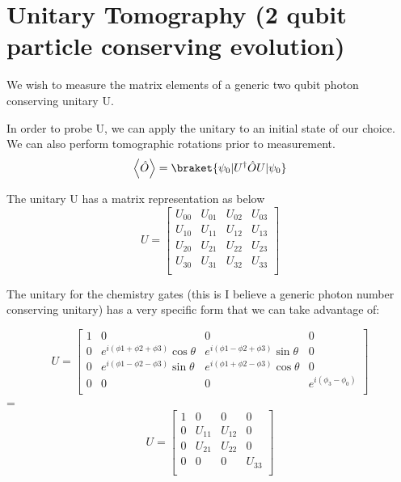 
\section{Unitary Tomography (2 qubit particle conserving evolution)}
We wish to measure the matrix elements of a generic two qubit photon conserving unitary U.

In order to probe U, we can apply the unitary to an initial state of our choice.  We can also perform tomographic rotations prior to measurement.
\begin{equation}
    \left< \hat{O} \right> = \braket{\psi_0 | U^{\dagger} \hat{O} U | \psi_0 }
\end{equation}

The unitary U has a matrix representation as below
\begin{equation}
    U =
    \begin{bmatrix}
        U_{00} & U_{01} & U_{02} & U_{03} \\
        U_{10} & U_{11} & U_{12} & U_{13} \\
        U_{20} & U_{21} & U_{22} & U_{23} \\
        U_{30} & U_{31} & U_{32} & U_{33} \\
    \end{bmatrix}
\end{equation}

The unitary for the chemistry gates (this is I believe a generic photon number conserving unitary) has a very specific form that we can take advantage of:

\begin{equation}
    U=
    \begin{bmatrix}
        1 & 0 & 0 & 0 \\
        0 & e^{ i (\phi{1} + \phi{2} + \phi{3})}\cos{\theta} & e^{ i (\phi{1} - \phi{2} + \phi{3})}\sin{\theta} & 0 \\
        0 & e^{ i (\phi{1} - \phi{2} - \phi{3})}\sin{\theta} & e^{ i (\phi{1} + \phi{2} - \phi{3})}\cos{\theta} & 0 \\
        0 & 0 & 0 & e^{i (\phi_{3}-\phi_{0})} \\
    \end{bmatrix}
\end{equation}=
\begin{equation}
    U=
    \begin{bmatrix}
        1 & 0 & 0 & 0 \\
        0 & U_{11} & U_{12} & 0 \\
        0 & U_{21} & U_{22} & 0 \\
        0 & 0 & 0 & U_{33} \\
    \end{bmatrix}
\end{equation}


